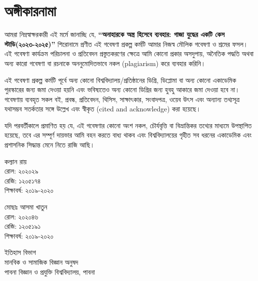 \clearpage
\section*{অঙ্গীকারনামা}

\vspace{1em}
আমরা নিম্নস্বাক্ষরকারী এই মর্মে জানাচ্ছি যে, \textbf{``অনাহারকে অস্ত্র হিসেবে ব্যবহার: গাজা যুদ্ধের একটি কেস স্টাডি(২০২৩-২০২৫)''} শিরোনামে প্রণীত এই গবেষণা প্রকল্প কর্মটি আমার নিজস্ব মৌলিক গবেষণা ও শ্রমের ফসল। এই গবেষণা কার্যক্রম পরিচালনা ও প্রতিবেদন প্রস্তুতকরণের ক্ষেত্রে আমি কোনো প্রকার অসদুপায়, অনৈতিক পদ্ধতি অথবা অন্য কারো গবেষণা বা রচনাকে অননুমোদিতভাবে নকল (plagiarism) করে ব্যবহার করিনি।

এই গবেষণা প্রকল্প কর্মটি পূর্বে অন্য কোনো বিশ্ববিদ্যালয়/প্রতিষ্ঠানের ডিগ্রি, ডিপ্লোমা বা অন্য কোনো একাডেমিক পুরস্কারের জন্য জমা দেওয়া হয়নি এবং ভবিষ্যতেও অন্য কোনো ডিগ্রির জন্য হুবহু আকারে জমা দেওয়া হবে না। গবেষণায় ব্যবহৃত সকল বই, প্রবন্ধ, প্রতিবেদন, থিসিস, সাক্ষাৎকার, সংবাদপত্র, ওয়েব উৎস এবং অন্যান্য তথ্যসূত্র যথাসম্ভব সতর্কতার সঙ্গে উল্লেখ এবং স্বীকৃত (cited and acknowledge) করা হয়েছে।

যদি পরবর্তীকালে প্রমাণিত হয় যে, এই গবেষণার কোনো অংশ নকল, চৌর্যবৃত্তি বা বিভ্রান্তিকর তথ্যের মাধ্যমে উপস্থাপিত হয়েছে, তবে এর সম্পূর্ণ দায়ভার আমি বহন করতে বাধ্য থাকব এবং বিশ্ববিদ্যালয়ের গৃহীত সব ধরনের একাডেমিক এবং প্রশাসনিক সিদ্ধান্ত মেনে নিতে রাজি আছি।
\vspace{2em}

\noindent\begin{minipage}[t]{0.48\textwidth}
\raggedright
কল্যান রায়\\
রোল: ২০২০২৯\\
রেজি: ১২০৫১৭৪\\
শিক্ষাবর্ষ: ২০১৯-২০২০
\end{minipage}%
\hfill
\begin{minipage}[t]{0.48\textwidth}
\raggedleft
মোছাঃ আসমা খাতুন\\
রোল: ২০২০৪৬\\
রেজি: ১২০৫১৯১\\
শিক্ষাবর্ষ: ২০১৯-২০২০
\end{minipage}

\vspace{2em}

\begin{center}
ইতিহাস বিভাগ\\
মানবিক ও সামাজিক বিজ্ঞান অনুষদ\\
পাবনা বিজ্ঞান ও প্রযুক্তি বিশ্ববিদ্যালয়, পাবনা
\end{center}

